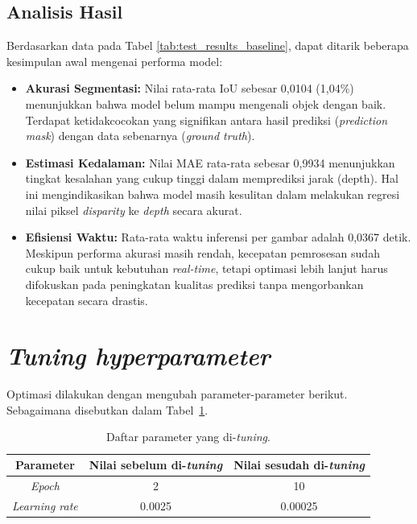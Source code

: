 \documentclass[12pt, a4paper]{article}
\begin{document}
\subsection{Analisis Hasil}
Berdasarkan data pada Tabel \ref{tab:test_results_baseline}, dapat ditarik beberapa kesimpulan awal mengenai performa model:
\begin{itemize}
    \item \textbf{Akurasi Segmentasi:} Nilai rata-rata IoU sebesar 0,0104 (1,04\%) menunjukkan bahwa model belum mampu mengenali objek dengan baik. Terdapat ketidakcocokan yang signifikan antara hasil prediksi (\textit{prediction mask}) dengan data sebenarnya (\textit{ground truth}).
    \item \textbf{Estimasi Kedalaman:} Nilai MAE rata-rata sebesar 0,9934 menunjukkan tingkat kesalahan yang cukup tinggi dalam memprediksi jarak (depth). Hal ini mengindikasikan bahwa model masih kesulitan dalam melakukan regresi nilai piksel \textit{disparity} ke \textit{depth} secara akurat.
    \item \textbf{Efisiensi Waktu:} Rata-rata waktu inferensi per gambar adalah 0,0367 detik. Meskipun performa akurasi masih rendah, kecepatan pemrosesan sudah cukup baik untuk kebutuhan \textit{real-time}, tetapi optimasi lebih lanjut harus difokuskan pada peningkatan kualitas prediksi tanpa mengorbankan kecepatan secara drastis.
\end{itemize}

\section{\textit{Tuning hyperparameter}}
Optimasi dilakukan dengan mengubah parameter-parameter berikut. Sebagaimana disebutkan dalam Tabel~\ref{tab:list_parameter}.

\begin{table}
    \centering
    \caption{Daftar parameter yang di-\textit{tuning}.}
    \label{tab:list_parameter}
    \begin{tabular}{|c|c|c|}
        \hline
        \textbf{Parameter}     & \textbf{Nilai sebelum di-\textit{tuning}} & \textbf{Nilai sesudah di-\textit{tuning}} \\ \hline
        \textit{Epoch}         & 2                                         & 10                                        \\ \hline
        \textit{Learning rate} & 0.0025                                    & 0.00025                                   \\ \hline
    \end{tabular}
\end{table}
\end{document}
